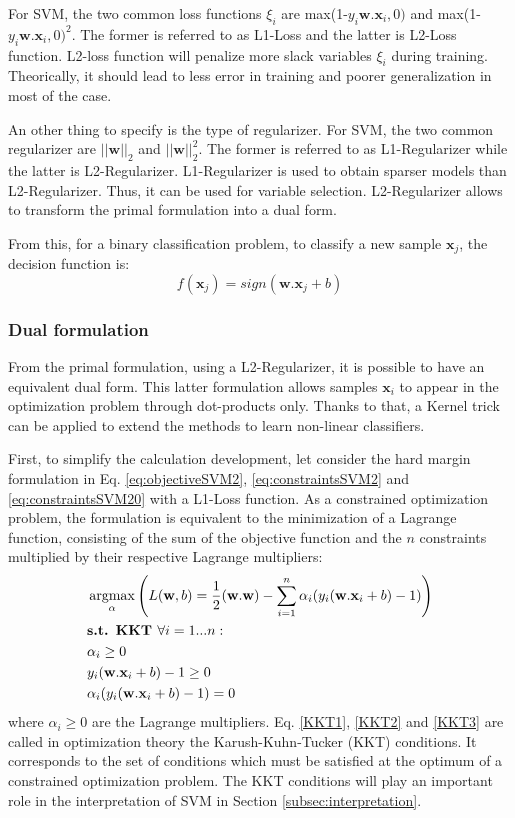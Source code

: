 For SVM, the two common loss functions $\xi_i$ are max(1-$y_i \textbf{w}. \textbf{x}_i, 0)$ and max(1-$y_i \textbf{w}.\textbf{x}_i, 0)^2$. The former is referred to as L1-Loss and the latter is L2-Loss function. L2-loss function will penalize more slack variables $\xi_i$ during training. Theorically, it should lead to less error in training and poorer generalization in most of the case.

An other thing to specify is the type of regularizer. For SVM, the two common regularizer are $||\textbf{w}||_2$ and $||\textbf{w}||_2^2$. The former is referred to as L1-Regularizer while the latter is L2-Regularizer. L1-Regularizer is used to obtain sparser models than L2-Regularizer. Thus, it can be used for variable selection. L2-Regularizer allows to transform the primal formulation into a dual form.

\noindent From this, for a binary classification problem, to classify a new sample $\textbf{x}_j$, the decision function is:
\begin{equation}
	f(\textbf{x}_j) = sign(\textbf{w}. \textbf{x}_j + b)
\end{equation}

\subsubsection{Dual formulation}
From the primal formulation, using a L2-Regularizer, it is possible to have an equivalent dual form. This latter formulation allows samples $\textbf{x}_i$ to appear in the optimization problem through dot-products only. Thanks to that, a Kernel trick can be applied to extend the methods to learn non-linear classifiers.

First, to simplify the calculation development, let consider the hard margin formulation in Eq. \ref{eq:objectiveSVM2}, \ref{eq:constraintsSVM2} and \ref{eq:constraintsSVM20} with a L1-Loss function. As a constrained optimization problem, the formulation is equivalent to the minimization of a Lagrange function, consisting of the sum of the objective function and the $n$ constraints multiplied by their respective Lagrange multipliers: 
\begin{align}
	& \argmax_{\alpha} \left( L(\textbf{w},b) = \frac{1}{2}(\textbf{w}.\textbf{w})-\sum\limits_{i=1}^{n}\alpha_i(y_i(\textbf{w}.\textbf{x}_i+b)-1) \right) \label{eq:Lagrange} \\
	& \textbf{s.t. KKT } \forall i = 1...n: \\
	& \alpha_i \geq 0 \label{KKT1}\\
	& y_i(\textbf{w}.\textbf{x}_i+b)-1 \geq 0 \label{KKT2}\\
	& \alpha_i (y_i(\textbf{w}.\textbf{x}_i+b)-1) = 0 \label{KKT3}
\end{align}
\noindent where $\alpha_i \geq 0$ are the Lagrange multipliers. Eq. \ref{KKT1}, \ref{KKT2} and \ref{KKT3} are called in optimization theory the Karush-Kuhn-Tucker (KKT) conditions. It corresponds to the set of conditions which must be satisfied at the optimum of a constrained optimization problem. The KKT conditions will play an important role in the interpretation of SVM in Section \ref{subsec:interpretation}. 

